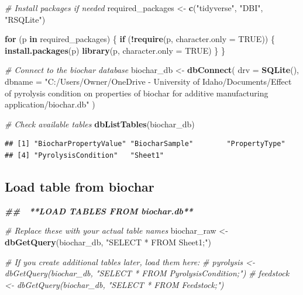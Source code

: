 \documentclass[
]{article}
\newenvironment{Shaded}{\begin{snugshade}}{\end{snugshade}}
\newcommand{\AttributeTok}[1]{\textcolor[rgb]{0.13,0.29,0.53}{#1}}
\newcommand{\CommentTok}[1]{\textcolor[rgb]{0.56,0.35,0.01}{\textit{#1}}}
\newcommand{\ConstantTok}[1]{\textcolor[rgb]{0.56,0.35,0.01}{#1}}
\newcommand{\ControlFlowTok}[1]{\textcolor[rgb]{0.13,0.29,0.53}{\textbf{#1}}}
\newcommand{\DocumentationTok}[1]{\textcolor[rgb]{0.56,0.35,0.01}{\textbf{\textit{#1}}}}
\newcommand{\FunctionTok}[1]{\textcolor[rgb]{0.13,0.29,0.53}{\textbf{#1}}}
\newcommand{\NormalTok}[1]{#1}
\newcommand{\OtherTok}[1]{\textcolor[rgb]{0.56,0.35,0.01}{#1}}
\newcommand{\SpecialCharTok}[1]{\textcolor[rgb]{0.81,0.36,0.00}{\textbf{#1}}}
\newcommand{\StringTok}[1]{\textcolor[rgb]{0.31,0.60,0.02}{#1}}
\begin{document}
\begin{Shaded}
\begin{Highlighting}[]
\CommentTok{\# Install packages if needed}
\NormalTok{required\_packages }\OtherTok{\textless{}{-}} \FunctionTok{c}\NormalTok{(}\StringTok{"tidyverse"}\NormalTok{, }\StringTok{"DBI"}\NormalTok{, }\StringTok{"RSQLite"}\NormalTok{)}

\ControlFlowTok{for}\NormalTok{ (p }\ControlFlowTok{in}\NormalTok{ required\_packages) \{}
  \ControlFlowTok{if}\NormalTok{ (}\SpecialCharTok{!}\FunctionTok{require}\NormalTok{(p, }\AttributeTok{character.only =} \ConstantTok{TRUE}\NormalTok{)) \{}
    \FunctionTok{install.packages}\NormalTok{(p)}
    \FunctionTok{library}\NormalTok{(p, }\AttributeTok{character.only =} \ConstantTok{TRUE}\NormalTok{)}
\NormalTok{  \}}
\NormalTok{\}}

\CommentTok{\# Connect to the biochar database}
\NormalTok{biochar\_db }\OtherTok{\textless{}{-}} \FunctionTok{dbConnect}\NormalTok{(}
  \AttributeTok{drv =} \FunctionTok{SQLite}\NormalTok{(),}
  \AttributeTok{dbname =} \StringTok{"C:/Users/Owner/OneDrive {-} University of Idaho/Documents/Effect of pyrolysis condition on properties of biochar for additive manufacturing application/biochar.db"}
\NormalTok{)}

\CommentTok{\# Check available tables}
\FunctionTok{dbListTables}\NormalTok{(biochar\_db)}
\end{Highlighting}
\end{Shaded}

\begin{verbatim}
## [1] "BiocharPropertyValue" "BiocharSample"        "PropertyType"        
## [4] "PyrolysisCondition"   "Sheet1"
\end{verbatim}

\subsection{Load table from biochar}\label{load-table-from-biochar}

\begin{Shaded}
\begin{Highlighting}[]
\DocumentationTok{\#\# 🔄 **LOAD TABLES FROM \textasciigrave{}biochar.db\textasciigrave{}**  }

\CommentTok{\# Replace these with your actual table names}
\NormalTok{biochar\_raw }\OtherTok{\textless{}{-}} \FunctionTok{dbGetQuery}\NormalTok{(biochar\_db, }\StringTok{"SELECT * FROM Sheet1;"}\NormalTok{)}

\CommentTok{\# If you create additional tables later, load them here:}
\CommentTok{\# pyrolysis \textless{}{-} dbGetQuery(biochar\_db, "SELECT * FROM PyrolysisCondition;")}
\CommentTok{\# feedstock \textless{}{-} dbGetQuery(biochar\_db, "SELECT * FROM Feedstock;")}
\end{Highlighting}
\end{Shaded}
\end{document}
